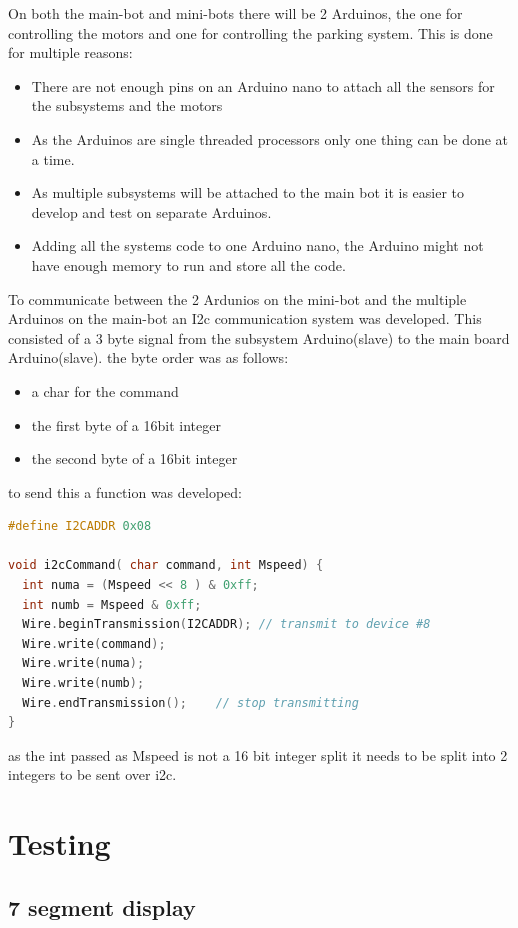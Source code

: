 On both the main-bot and mini-bots there will be 2 Arduinos, the one for controlling the motors and one for controlling the parking system. This is done for multiple reasons:
\begin{itemize}
\item There are not enough pins on an Arduino nano to attach all the sensors for the subsystems and the motors
\item As the Arduinos are single threaded processors only one thing can be done at a time. 
\item As multiple subsystems will be attached to the main bot it is easier to develop and test on separate Arduinos.
\item Adding all the systems code to one Arduino nano, the Arduino might not have enough memory to run and store all the code. 
\end{itemize}

To communicate between the 2 Ardunios on the mini-bot and the multiple Arduinos on the main-bot an I2c communication system was developed. This consisted of a 3 byte signal from the subsystem Arduino(slave) to the main board Arduino(slave). the byte order was as follows:
\begin{itemize}
\item a char for the command
\item the first byte of a 16bit integer
\item the second byte of a 16bit integer
\end{itemize}   
to send this a function was developed:

\begin{lstlisting}[language=c,caption={i2c communication function},label={i2c communication function}]
#define I2CADDR 0x08
	
void i2cCommand( char command, int Mspeed) {
  int numa = (Mspeed << 8 ) & 0xff;
  int numb = Mspeed & 0xff;
  Wire.beginTransmission(I2CADDR); // transmit to device #8
  Wire.write(command);
  Wire.write(numa);
  Wire.write(numb);
  Wire.endTransmission();    // stop transmitting
}
\end{lstlisting}

as the int passed as Mspeed is not a 16 bit integer split it needs to be split into 2 integers to be sent over i2c.


	\chapter{Testing}
	
\section{7 segment display}

